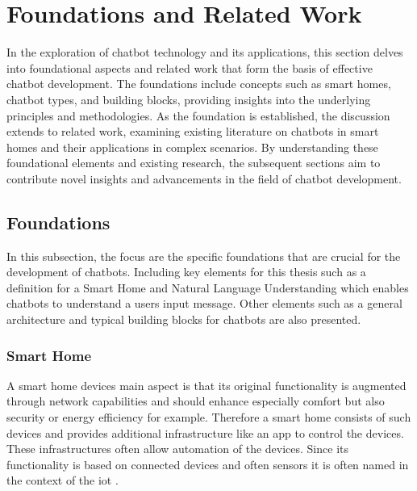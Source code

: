 
\chapter{Foundations and Related Work}
\label{chap:ch2}
\label{chap:foundation}

In the exploration of chatbot technology and its applications, this section delves into foundational aspects and related work that form the basis of effective chatbot development. 
The foundations include concepts such as smart homes, chatbot types, and building blocks, providing insights into the underlying principles and methodologies. 
As the foundation is established, the discussion extends to related work, examining existing literature on chatbots in smart homes and their applications in complex scenarios. 
By understanding these foundational elements and existing research, the subsequent sections aim to contribute novel insights and advancements in the field of chatbot development.

\section{Foundations}
\label{sec:foundation}
In this subsection, the focus are the specific foundations that are crucial for the development of chatbots.
Including key elements for this thesis such as a definition for a Smart Home and Natural Language Understanding which enables chatbots to understand a users input message.
Other elements such as a general architecture and typical building blocks for chatbots are also presented.

\subsection{Smart Home} 
A smart home devices main aspect is that its original functionality is augmented through network capabilities \cite{schiefer_smart_2015,balakrishnan_smart_2018} and should enhance especially comfort \cite{matsui_information_2018, balakrishnan_smart_2018} but also security \cite{balakrishnan_smart_2018} or energy efficiency \cite{matsui_information_2018, balakrishnan_smart_2018} for example. 
Therefore a smart home consists of such devices and provides additional infrastructure like an app to control the devices. 
These infrastructures often allow automation of the devices.
Since its functionality is based on connected devices and often sensors it is often named in the context of the \gls{iot} \cite{atzori_internet_2010}. 

